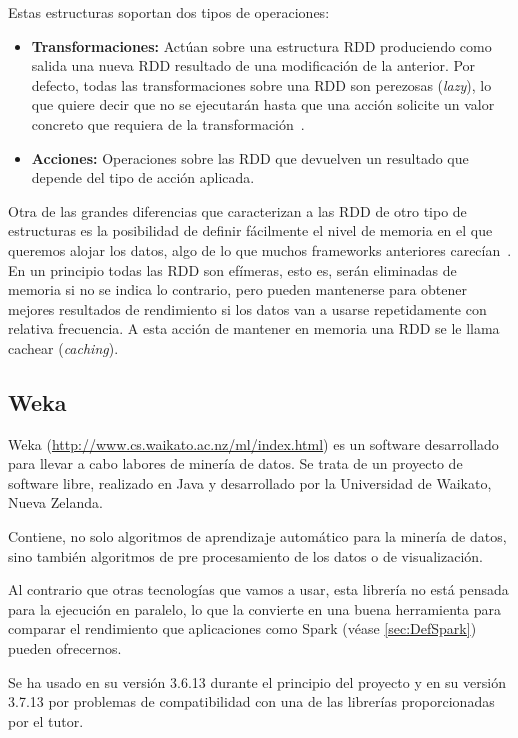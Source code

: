 Estas estructuras soportan dos tipos de operaciones:

\begin{itemize}
	\item \textbf{Transformaciones:} Actúan sobre una estructura RDD produciendo como salida una nueva RDD resultado de una modificación de la anterior. Por defecto, todas las transformaciones sobre una RDD son perezosas (\textit{lazy}), lo que quiere decir que no se ejecutarán hasta que una acción solicite un valor concreto que requiera de la transformación~\cite{SparkPaper}.
	\item \textbf{Acciones:} Operaciones sobre las RDD que devuelven un resultado que depende del tipo de acción aplicada.
\end{itemize}

Otra de las grandes diferencias que caracterizan a las RDD de otro tipo de estructuras es la posibilidad de definir fácilmente el nivel de memoria en el que queremos alojar los datos, algo de lo que muchos frameworks anteriores carecían~\cite{RDDPaper}. En un principio todas las RDD son efímeras, esto es, serán eliminadas de memoria si no se indica lo contrario, pero pueden mantenerse para obtener mejores resultados de rendimiento si los datos van a usarse repetidamente con relativa frecuencia. A esta acción de mantener en memoria una RDD se le llama cachear (\textit{caching}).



\subsection{Weka}\label{sec:DefWeka}
Weka (\url{http://www.cs.waikato.ac.nz/ml/index.html}) es un software desarrollado para llevar a cabo labores de minería de datos. Se trata de un proyecto de software libre, realizado en Java y desarrollado por la Universidad de Waikato, Nueva Zelanda.

Contiene, no solo algoritmos de aprendizaje automático para la minería de datos, sino también algoritmos de pre procesamiento de los datos o de visualización.

Al contrario que otras tecnologías que vamos a usar, esta librería no está pensada para la ejecución en paralelo, lo que la convierte en una buena herramienta para comparar el rendimiento que aplicaciones como Spark (véase \ref{sec:DefSpark}) pueden ofrecernos.

Se ha usado en su versión 3.6.13 durante el principio del proyecto y en su versión 3.7.13 por problemas de compatibilidad con una de las librerías proporcionadas por el tutor.

